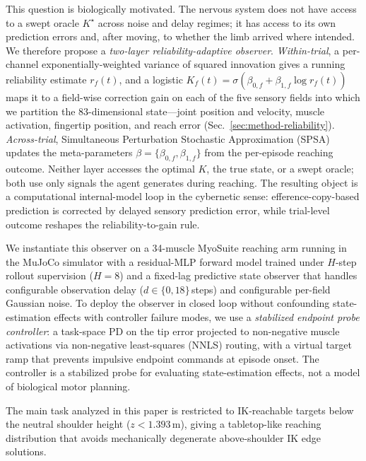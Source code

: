 \documentclass[sn-mathphys,NameDate,iicol]{sn-jnl}
\begin{document}
This question is biologically motivated. The nervous system does not
have access to a swept oracle $K^{\star}$ across noise and delay
regimes; it has access to its own prediction errors and, after
moving, to whether the limb arrived where intended. We therefore
propose a \emph{two-layer reliability-adaptive observer}.
\emph{Within-trial}, a per-channel exponentially-weighted variance
of squared innovation gives a running reliability estimate
$r_f(t)$, and a logistic
$K_f(t)\!=\!\sigma(\beta_{0,f}\!+\!\beta_{1,f}\log r_f(t))$ maps it
to a field-wise correction gain on each of the five sensory fields
into which we partition the 83-dimensional state---joint position and
velocity, muscle activation, fingertip position, and reach error
(Sec.~\ref{sec:method-reliability}). \emph{Across-trial}, Simultaneous
Perturbation Stochastic Approximation (SPSA) \cite{spall1992spsa}
updates the meta-parameters $\beta\!=\!\{\beta_{0,f},\beta_{1,f}\}$
from the per-episode reaching outcome. Neither layer accesses the
optimal $K$, the true state, or a swept oracle; both use only
signals the agent generates during reaching. The resulting object
is a computational internal-model loop in the cybernetic sense:
efference-copy-based prediction is corrected by delayed sensory
prediction error, while trial-level outcome reshapes the
reliability-to-gain rule.

We instantiate this observer on a 34-muscle MyoSuite reaching arm
\cite{caggiano2022myosuite} running in the MuJoCo simulator
\cite{todorov2012mujoco} with a residual-MLP forward model trained
under $H$-step rollout supervision ($H{=}8$) and a fixed-lag
predictive state observer that handles configurable observation
delay ($d\!\in\!\{0,18\}$\,steps) and configurable per-field
Gaussian noise. To deploy the observer in closed loop without
confounding state-estimation effects with controller failure modes,
we use a \emph{stabilized endpoint probe controller}: a task-space
PD on the tip error projected to non-negative muscle activations via
non-negative least-squares (NNLS) routing, with a virtual target
ramp that prevents impulsive endpoint commands at episode onset.
The controller is a stabilized probe for evaluating state-estimation
effects, not a model of biological motor planning.

The main task analyzed in this paper is restricted to IK-reachable
targets below the neutral shoulder height ($z \!<\! 1.393$\,m),
giving a tabletop-like reaching distribution that avoids mechanically
degenerate above-shoulder IK edge solutions.
\end{document}
